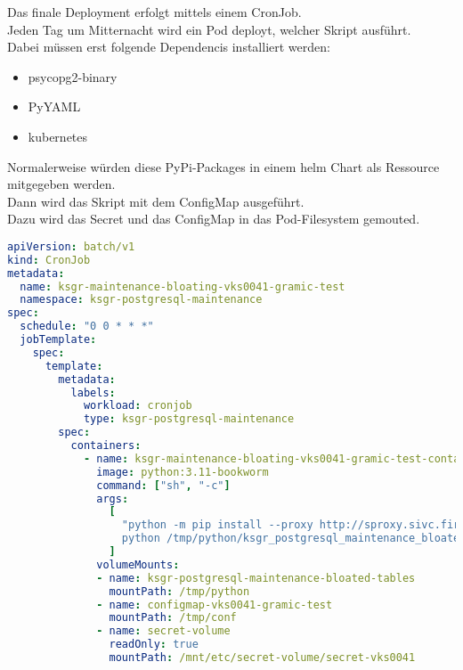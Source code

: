 \begin{flushleft}
    Das finale Deployment erfolgt mittels einem CronJob.\\
    Jeden Tag um Mitternacht wird ein Pod deployt, welcher Skript ausführt.\\
    Dabei müssen erst folgende Dependencis installiert werden:
    \begin{itemize}
        \item psycopg2-binary
        \item PyYAML
        \item kubernetes
    \end{itemize}
    Normalerweise würden diese PyPi-Packages in einem \gls{helm} Chart als Ressource mitgegeben werden.\\
    Dann wird das Skript mit dem ConfigMap ausgeführt.\\
    Dazu wird das Secret und das ConfigMap in das Pod-Filesystem gemouted.
    \lstset{style=gra_codestyle}
    \begin{lstlisting}[language=yaml, caption=Maintenance-Tool - Bloated Tables / Indices - ksgr-maintenance-bloating-vks0041-gramic-test,captionpos=b,label={lst:maintenannce-tool-bloated-tables-ksgr-maintenance-bloating-vks0041-gramic-test},breaklines=true]
apiVersion: batch/v1
kind: CronJob
metadata:
  name: ksgr-maintenance-bloating-vks0041-gramic-test
  namespace: ksgr-postgresql-maintenance
spec:
  schedule: "0 0 * * *"
  jobTemplate:
    spec:
      template:
        metadata:
          labels:
            workload: cronjob
            type: ksgr-postgresql-maintenance
        spec:
          containers:
            - name: ksgr-maintenance-bloating-vks0041-gramic-test-container
              image: python:3.11-bookworm
              command: ["sh", "-c"]
              args:
                [
                  "python -m pip install --proxy http://sproxy.sivc.first-it.ch:8080 psycopg2-binary PyYAML kubernetes;
                  python /tmp/python/ksgr_postgresql_maintenance_bloated_tables.py /tmp/conf/configmap-vks0041-gramic-test.yaml"
                ]
              volumeMounts:
              - name: ksgr-postgresql-maintenance-bloated-tables
                mountPath: /tmp/python
              - name: configmap-vks0041-gramic-test
                mountPath: /tmp/conf
              - name: secret-volume
                readOnly: true
                mountPath: /mnt/etc/secret-volume/secret-vks0041


\end{lstlisting}
\end{flushleft}
